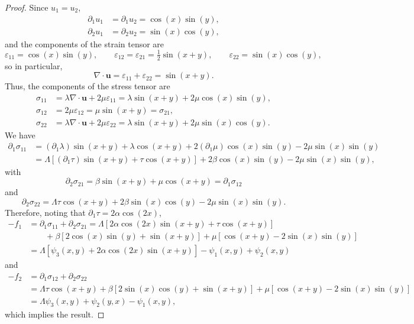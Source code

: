 \documentclass[a4paper,12pt]{article}
\newcommand{\bs}[1]{\boldsymbol{#1}}
\begin{document}
\begin{proof}
Since $u_1=u_2$,
\begin{align*}
\partial_1u_1&=\partial_1u_2=\cos(x)\sin(y),\\
\partial_2u_1&=\partial_2u_2=\sin(x)\cos(y),
\end{align*}
and the components of the strain tensor are
\[
\varepsilon_{11}=\cos(x)\sin(y),\qquad
\varepsilon_{12}=\varepsilon_{21}=\tfrac12\sin(x+y),\qquad
\varepsilon_{22}=\sin(x)\cos(y),
\]
so in particular,
\[
\nabla\cdot\bs{u}=\varepsilon_{11}+\varepsilon_{22}=\sin(x+y).
\]
Thus, the components of the stress tensor are
\begin{align*}
\sigma_{11}&=\lambda\nabla\cdot\bs{u}+2\mu\varepsilon_{11}
    =\lambda\sin(x+y)+2\mu\cos(x)\sin(y),\\
\sigma_{12}&=2\mu\varepsilon_{12}=\mu\sin(x+y)=\sigma_{21},\\
\sigma_{22}&=\lambda\nabla\cdot\bs{u}+2\mu\varepsilon_{22}
    =\lambda\sin(x+y)+2\mu\sin(x)\cos(y).
\end{align*}
We have
\begin{align*}
\partial_1\sigma_{11}&=(\partial_1\lambda)\sin(x+y)+\lambda\cos(x+y)
    +2(\partial_1\mu)\cos(x)\sin(y)-2\mu\sin(x)\sin(y)\\
    &=\Lambda[(\partial_1\tau)\sin(x+y)+\tau\cos(x+y)]
    +2\beta\cos(x)\sin(y)-2\mu\sin(x)\sin(y),
\end{align*}
with
\[
\partial_2\sigma_{21}=\beta\sin(x+y)+\mu\cos(x+y)=\partial_1\sigma_{12}
\]
and
\[
\partial_2\sigma_{22}=\Lambda\tau\cos(x+y)+2\beta\sin(x)\cos(y)
    -2\mu\sin(x)\sin(y).
\]
Therefore, noting that $\partial_1\tau=2\alpha\cos(2x)$,
\begin{align*}
-f_1&=\partial_1\sigma_{11}+\partial_2\sigma_{21}
    =\Lambda[2\alpha\cos(2x)\sin(x+y)+\tau\cos(x+y)]\\
    &\qquad{}+\beta[2\cos(x)\sin(y)+\sin(x+y)]+\mu[\cos(x+y)-2\sin(x)\sin(y)]\\
    &=\Lambda[\psi_3(x,y)+2\alpha\cos(2x)\sin(x+y)]-\psi_1(x,y)+\psi_2(x,y)
\end{align*}
and
\begin{align*}
-f_2&=\partial_1\sigma_{12}+\partial_2\sigma_{22}\\
    &=\Lambda\tau\cos(x+y)+\beta[2\sin(x)\cos(y)
    +\sin(x+y)]+\mu[\cos(x+y)-2\sin(x)\sin(y)]\\
    &=\Lambda\psi_3(x,y)+\psi_2(y,x)-\psi_1(x,y),
\end{align*}
which implies the result.
\end{proof}
\end{document}
